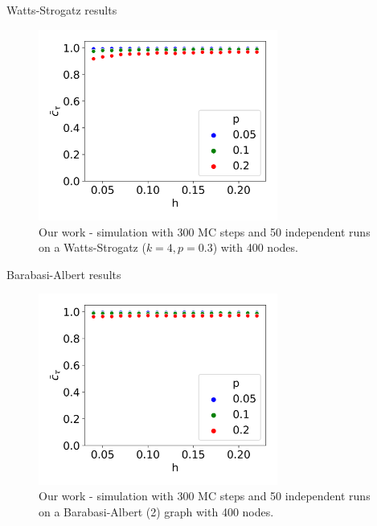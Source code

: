 \documentclass[10pt]{beamer}
\begin{document}
\begin{frame}{Watts-Strogatz results}
	\begin{figure}
		\includegraphics[width=0.7\textwidth]{../results/images/hp-watts-strogatz.png}
		\caption{Our work - simulation with 300 MC steps and 50 independent runs on a Watts-Strogatz ($k=4, p=0.3$) with 400 nodes.}
	\end{figure}
\end{frame}

\begin{frame}{Barabasi-Albert results}
	\begin{figure}
		\includegraphics[width=0.7\textwidth]{../results/images/hp-barabasi-albert.png}
		\caption{Our work - simulation with 300 MC steps and 50 independent runs on a Barabasi-Albert (2) graph with 400 nodes.}
	\end{figure}
\end{frame}
\end{document}
